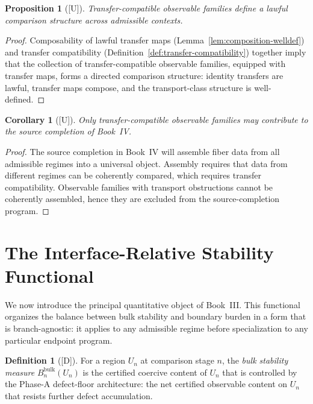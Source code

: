 \documentclass[12pt,oneside]{amsbook}
\theoremstyle{plain}
\newtheorem{proposition}[theorem]{Proposition}
\newtheorem{corollary}[theorem]{Corollary}
\theoremstyle{definition}
\newtheorem{definition}[theorem]{Definition}
\theoremstyle{remark}
\newcommand{\status}[1]{\textup{[#1]}}
\begin{document}
\begin{proposition}[\status{U}]\label{prop:compatible-comparison-structure}
Transfer-compatible observable families define a lawful comparison
structure across admissible contexts.
\end{proposition}

\begin{proof}
Composability of lawful transfer maps
(Lemma~\ref{lem:composition-welldef}) and transfer compatibility
(Definition~\ref{def:transfer-compatibility}) together imply that the
collection of transfer-compatible observable families, equipped with
transfer maps, forms a directed comparison structure: identity
transfers are lawful, transfer maps compose, and the transport-class
structure is well-defined.
\end{proof}

\begin{corollary}[\status{U}]\label{cor:compatible-for-source}
Only transfer-compatible observable families may contribute to the
source completion of Book~IV.
\end{corollary}

\begin{proof}
The source completion in Book~IV will assemble fiber data from all
admissible regimes into a universal object.  Assembly requires that
data from different regimes can be coherently compared, which requires
transfer compatibility.  Observable families with transport
obstructions cannot be coherently assembled, hence they are excluded
from the source-completion program.
\end{proof}

\section{The Interface-Relative Stability Functional}

We now introduce the principal quantitative object of Book~III.
This functional organizes the balance between bulk stability and
boundary burden in a form that is branch-agnostic: it applies to any
admissible regime before specialization to any particular endpoint
program.

\begin{definition}[\status{D}]\label{def:bulk-stability}
For a region $U_n$ at comparison stage $n$, the \emph{bulk stability
measure} $B_n^{\mathrm{bulk}}(U_n)$ is the certified coercive content
of $U_n$ that is controlled by the Phase-A defect-floor architecture:
the net certified observable content on $U_n$ that resists further
defect accumulation.
\end{definition}
\end{document}
